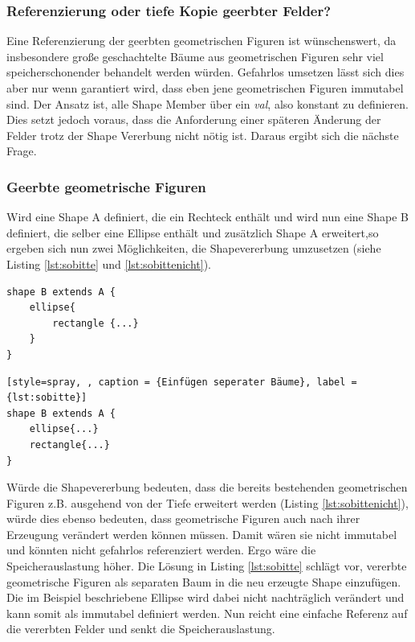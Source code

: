 \subsubsection{Referenzierung oder tiefe Kopie geerbter Felder?}\label{referenceorclone}
Eine Referenzierung der geerbten geometrischen Figuren ist \linebreak wünschenswert, da insbesondere große geschachtelte Bäume aus geometrischen Figuren sehr viel speicherschonender behandelt werden würden. Gefahrlos umsetzen lässt sich dies aber nur wenn garantiert wird, dass eben jene geometrischen Figuren immutabel sind.
Der Ansatz ist, alle Shape Member über ein \textit{val}, also konstant zu definieren. Dies setzt jedoch voraus, dass die Anforderung einer späteren Änderung der Felder trotz der Shape Vererbung nicht nötig ist. Daraus ergibt sich die nächste Frage.
\subsubsection{Geerbte geometrische Figuren}
Wird eine Shape A definiert, die ein Rechteck enthält
und wird nun eine Shape B definiert, die selber eine Ellipse enthält und zusätzlich Shape A erweitert,so ergeben sich nun zwei Möglichkeiten, die Shapevererbung umzusetzen (siehe Listing \ref{lst:sobitte} und \ref{lst:sobittenicht}).\begin{lstlisting}[style=spray, caption = {Erweiterung der geometrischen Figuren anhand z.B. der Tiefe der Elemente}, label = {lst:sobittenicht}]
shape B extends A {
    ellipse{
        rectangle {...}
    }
}
\end{lstlisting}
\begin{lstlisting}[style=spray, , caption = {Einfügen seperater Bäume}, label = {lst:sobitte}]
shape B extends A {
    ellipse{...}
    rectangle{...}
}
\end{lstlisting}Würde die Shapevererbung bedeuten, dass die bereits bestehenden geometrischen Figuren z.B. ausgehend von der Tiefe erweitert werden (Listing \ref{lst:sobittenicht}), würde dies ebenso bedeuten, dass geometrische Figuren auch nach ihrer Erzeugung verändert werden können müssen. Damit wären sie nicht immutabel und könnten nicht gefahrlos referenziert werden. Ergo wäre die Speicherauslastung höher. Die Lösung in Listing \ref{lst:sobitte} schlägt vor, vererbte geometrische Figuren als separaten Baum in die neu erzeugte Shape einzufügen. Die im Beispiel beschriebene Ellipse wird dabei nicht nachträglich verändert und kann somit als immutabel definiert werden. Nun reicht eine einfache Referenz auf die vererbten Felder und senkt die Speicherauslastung.
